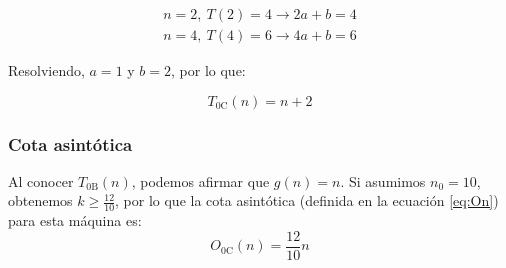 \begin{subequations}
    \begin{gather}
        n = 2,\ T(2) = 4 \rightarrow 2a + b = 4 \\
        n = 4,\ T(4) = 6 \rightarrow 4a + b = 6
    \end{gather}
\end{subequations}

Resolviendo, $a = 1$ y $b=2$, por lo que:

\begin{equation}
    T_{\mathrm{0C}}(n) = n + 2
\end{equation}


\subsubsection*{Cota asintótica}
Al conocer $T_{\mathrm{0B}}(n)$, podemos afirmar que $g(n) = n$. Si asumimos $n_0 = 10$, obtenemos $k \geq \frac{12}{10}$, por lo que la cota asintótica (definida en la ecuación \ref{eq:On}) para esta máquina es:
\begin{equation}
    O_{\mathrm{0C}}(n) = \frac{12}{10} n
\end{equation}

